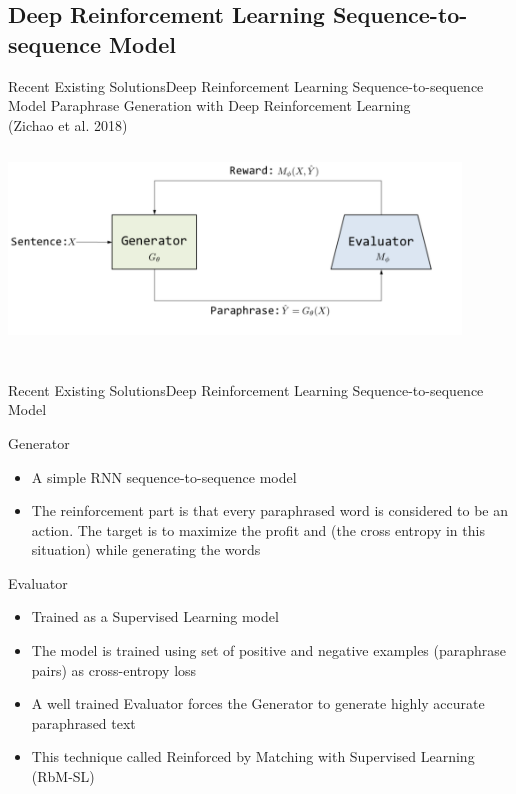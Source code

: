 \documentclass[10pt]{beamer}
\begin{document}
\subsection{Deep Reinforcement Learning Sequence-to-sequence Model}
\begin{frame}{Recent Existing Solutions}{Deep Reinforcement Learning Sequence-to-sequence Model}
\centering
Paraphrase Generation with Deep Reinforcement Learning \\
(Zichao et al. 2018)
\centering
\includegraphics[width=12cm, height=6cm]{rl.png}
\end{frame}

\begin{frame}{Recent Existing Solutions}{Deep Reinforcement Learning Sequence-to-sequence Model}

\begin{block}{Generator}
	\begin{itemize}
    	\item <1-> A simple RNN sequence-to-sequence model
		\item <1-> The reinforcement part is that every paraphrased word is considered to be an action. The target is to maximize the profit and (the cross entropy in this situation) while generating the words
	\end{itemize}
\end{block}

\begin{block}{Evaluator}
	\begin{itemize}
    	\item <1-> Trained as a Supervised Learning model
		\item <1-> The model is trained using set of positive and negative examples (paraphrase pairs) as cross-entropy loss
        \item <1-> A well trained Evaluator forces the Generator to generate highly accurate paraphrased text
        \item <1-> This technique called Reinforced by Matching with Supervised Learning (RbM-SL)
	\end{itemize}
\end{block}
\end{frame}
\end{document}
